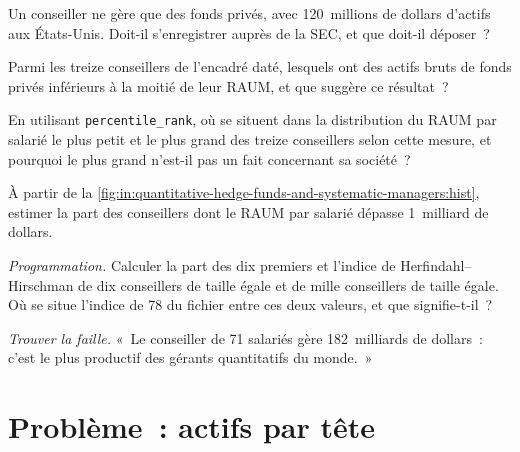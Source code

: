 \begin{exercise}[$\star$]\label{exo:in:quantitative-hedge-funds-and-systematic-managers:3}
Un conseiller ne gère que des fonds privés, avec 120~millions de dollars d'actifs aux États-Unis. Doit-il s'enregistrer auprès de la
SEC, et que doit-il déposer~?
\end{exercise}

\begin{exercise}[$\star\star$]\label{exo:in:quantitative-hedge-funds-and-systematic-managers:4}
Parmi les treize conseillers de l'encadré daté, lesquels ont des actifs bruts de fonds privés inférieurs à la moitié de leur RAUM, et que
suggère ce résultat~?
\end{exercise}

\begin{exercise}[$\star\star$]\label{exo:in:quantitative-hedge-funds-and-systematic-managers:5}
En utilisant \texttt{percentile\_rank}, où se situent dans la distribution du RAUM par salarié le plus petit et le plus grand des
treize conseillers selon cette mesure, et pourquoi le plus grand n'est-il pas un fait concernant sa société~?
\end{exercise}

\begin{exercise}[$\star\star$]\label{exo:in:quantitative-hedge-funds-and-systematic-managers:6}
À partir de la \cref{fig:in:quantitative-hedge-funds-and-systematic-managers:hist}, estimer la part des conseillers dont le RAUM par
salarié dépasse 1~milliard de dollars.
\end{exercise}

\begin{exercise}[$\star\star\star$]\label{exo:in:quantitative-hedge-funds-and-systematic-managers:7}
\emph{Programmation.} Calculer la part des dix premiers et l'indice de Herfindahl--Hirschman de dix conseillers de taille égale et de mille
conseillers de taille égale. Où se situe l'indice de 78 du fichier entre ces deux valeurs, et que signifie-t-il~?
\end{exercise}

\begin{exercise}[$\star\star\star$]\label{exo:in:quantitative-hedge-funds-and-systematic-managers:8}
\emph{Trouver la faille.} «~Le conseiller de 71 salariés gère 182~milliards de dollars~: c'est le plus productif des gérants quantitatifs
du monde.~»
\end{exercise}

\section{Problème~: actifs par tête}

